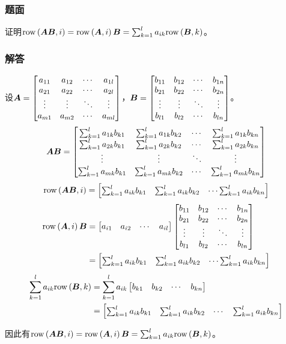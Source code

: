 \documentclass{beamer}
\begin{document}
\begin{frame}
\frametitle{题面}

    证明\(\row{\mata\matb}{i}=\row{\mata}{i}\matb=\sum_{k=1}^la_{ik}\row{\matb}{k}\)。

\end{frame}

\begin{frame}[allowframebreaks]
\frametitle{解答}

    设\(\mata=\normmat{bmatrix}{a}{m}{l}\)，\(\matb=\normmat{bmatrix}{b}{l}{n}\)。
    \begin{equation*}
        \mata\matb=
        \begin{bmatrix}
            \sum_{k=1}^la_{1k}b_{k1} & \sum_{k=1}^la_{1k}b_{k2} & \cdots & \sum_{k=1}^la_{1k}b_{kn} \\
            \sum_{k=1}^la_{2k}b_{k1} & \sum_{k=1}^la_{2k}b_{k2} & \cdots & \sum_{k=1}^la_{2k}b_{kn} \\
            \vdots                   & \vdots                   & \ddots & \vdots                   \\
            \sum_{k=1}^la_{mk}b_{k1} & \sum_{k=1}^la_{mk}b_{k2} & \cdots & \sum_{k=1}^la_{mk}b_{kn}
        \end{bmatrix}
    \end{equation*}
    \begin{equation*}
        \row{\mata\matb}{i}=
        \begin{bmatrix}
            \sum_{k=1}^la_{ik}b_{k1} & \sum_{k=1}^la_{ik}b_{k2} & \cdots\sum_{k=1}^la_{ik}b_{kn}
        \end{bmatrix}
    \end{equation*}
    \begin{align*}
        \row{\mata}{i}\matb & =
        \begin{bmatrix}
            a_{i1} & a_{i2} & \cdots & a_{il}
        \end{bmatrix}\normmat{bmatrix}{b}{l}{n} \\
                            & =
        \begin{bmatrix}
            \sum_{k=1}^la_{ik}b_{k1} & \sum_{k=1}^la_{ik}b_{k2} & \cdots\sum_{k=1}^la_{ik}b_{kn}
        \end{bmatrix}
    \end{align*}
    \begin{align*}
        \sum_{k=1}^la_{ik}\row{\matb}{k} & =\sum_{k=1}^la_{ik}
        \begin{bmatrix}
            b_{k1} & b_{k2} & \cdots & b_{kn}
        \end{bmatrix}                             \\
                                         & =
        \begin{bmatrix}
\sum_{k=1}^la_{ik}b_{k1} & \sum_{k=1}^la_{ik}b_{k2} &\cdots&\sum_{k=1}^la_{ik}b_{kn}
        \end{bmatrix}
    \end{align*}

    因此有\(\row{\mata\matb}{i}=\row{\mata}{i}\matb=\sum_{k=1}^la_{ik}\row{\matb}{k}\)。

\end{frame}
\end{document}
